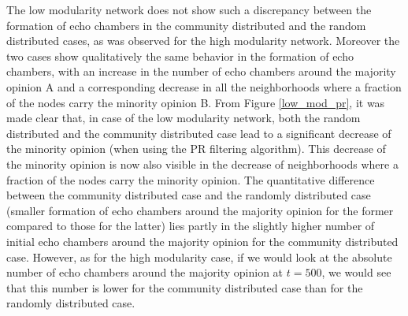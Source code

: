 \documentclass[11 pt , letterpaper , twoside , openright]{book}
\begin{document}
\newline
The low modularity network does not show such a discrepancy between the formation of echo chambers in the community distributed and the random distributed cases, as was observed for the high modularity network. Moreover the two cases show qualitatively the same behavior in the formation of echo chambers, with an increase in the number of echo chambers around the majority opinion A and a corresponding decrease in all the neighborhoods where a fraction of the nodes carry the minority opinion B. From Figure \ref{low_mod_pr}, it was made clear that, in case of the low modularity network, both the random distributed and the community distributed case lead to a significant decrease of the minority opinion (when using the PR filtering algorithm). This decrease of the minority opinion is now also visible in the decrease of neighborhoods where a fraction of the nodes carry the minority opinion. The quantitative difference between the community distributed case and the randomly distributed case (smaller formation of echo chambers around the majority opinion for the former compared to those for the latter) lies partly in the slightly higher number of initial echo chambers around the majority opinion for the community distributed case. However, as for the high modularity case, if we would look at the absolute number of echo chambers around the majority opinion at $t=500$, we would see that this number is lower for the community distributed case than for the randomly distributed case. %
\end{document}
